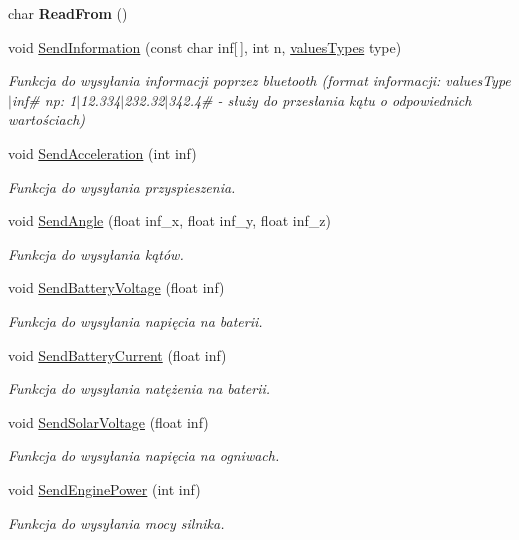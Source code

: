 \begin{DoxyCompactItemize}
\item 
\hypertarget{class_bluetooth_abb184c4dc820af7a3029376bb41b6575}{}char {\bfseries Read\+From} ()\label{class_bluetooth_abb184c4dc820af7a3029376bb41b6575}

\item 
void \hyperlink{class_bluetooth_a84791d154c8d7527504155c9300db02e}{Send\+Information} (const char inf\mbox{[}$\,$\mbox{]}, int n, \hyperlink{class_bluetooth_a536240e6a8686ee703909e464ec0d6a3}{values\+Types} type)
\begin{DoxyCompactList}\small\item\em Funkcja do wysyłania informacji poprzez bluetooth (format informacji\+: values\+Type$\vert$inf\# np\+: 1$\vert$12.334$\vert$232.32$\vert$342.4\# -\/ służy do przesłania kątu o odpowiednich wartościach) \end{DoxyCompactList}\item 
void \hyperlink{class_bluetooth_abb81f14b6e9cf222d4483208c509bf47}{Send\+Acceleration} (int inf)
\begin{DoxyCompactList}\small\item\em Funkcja do wysyłania przyspieszenia. \end{DoxyCompactList}\item 
void \hyperlink{class_bluetooth_ad969649c0fb2bbc0d0e10dc13097adc1}{Send\+Angle} (float inf\+\_\+x, float inf\+\_\+y, float inf\+\_\+z)
\begin{DoxyCompactList}\small\item\em Funkcja do wysyłania kątów. \end{DoxyCompactList}\item 
void \hyperlink{class_bluetooth_acd8e91ec4fef6c316360af35ade48c16}{Send\+Battery\+Voltage} (float inf)
\begin{DoxyCompactList}\small\item\em Funkcja do wysyłania napięcia na baterii. \end{DoxyCompactList}\item 
void \hyperlink{class_bluetooth_aeffcdd4686fd61b19980e6f94a5b3e3c}{Send\+Battery\+Current} (float inf)
\begin{DoxyCompactList}\small\item\em Funkcja do wysyłania natężenia na baterii. \end{DoxyCompactList}\item 
void \hyperlink{class_bluetooth_af03fcaf2971e2257e1b355cc2e2b6eeb}{Send\+Solar\+Voltage} (float inf)
\begin{DoxyCompactList}\small\item\em Funkcja do wysyłania napięcia na ogniwach. \end{DoxyCompactList}\item 
void \hyperlink{class_bluetooth_a84e34a80fdd89f30d2ffc698ea407453}{Send\+Engine\+Power} (int inf)
\begin{DoxyCompactList}\small\item\em Funkcja do wysyłania mocy silnika. \end{DoxyCompactList}\end{DoxyCompactItemize}


